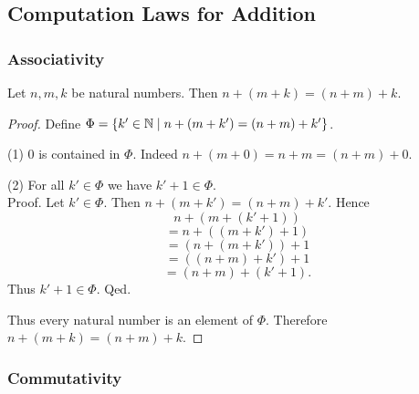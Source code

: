 \documentclass[10pt]{article}
\begin{document}
  \subsection*{Computation Laws for Addition}

  \subsubsection*{Associativity}

  \begin{forthel}
    \begin{proposition}
      Let $n, m, k$ be natural numbers.
      Then $n + (m + k) = (n + m) + k$.
    \end{proposition}
    \begin{proof}
      Define $\Phi = \{ k' \in \mathbb{N} \mid n + (m + k') = (n + m) + k' \}$.

      (1) $0$ is contained in $\Phi$.
      Indeed $n + (m + 0) = n + m = (n + m) + 0$.

      (2) For all $k' \in \Phi$ we have $k' + 1 \in \Phi$. \\
      Proof.
        Let $k' \in \Phi$.
        Then $n + (m + k') = (n + m) + k'$.
        Hence
        \[  n + (m + (k' + 1))        \]
        \[    = n + ((m + k') + 1)    \]
        \[    = (n + (m + k')) + 1    \]
        \[    = ((n + m) + k') + 1    \]
        \[    = (n + m) + (k' + 1).   \]
        Thus $k' + 1 \in \Phi$.
      Qed.

      Thus every natural number is an element of $\Phi$.
      Therefore $n + (m + k) = (n + m) + k$.
    \end{proof}
  \end{forthel}


  \subsubsection*{Commutativity}
\end{document}
